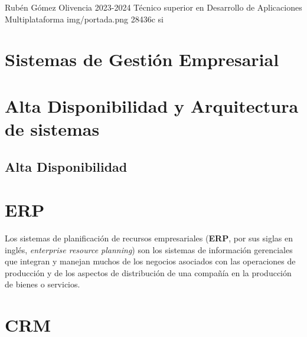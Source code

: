\documentclass{\ClassPath/yukibook}
\begin{document}
    {Rubén Gómez Olivencia}  %
    {2023-2024}    %
    {Técnico superior en \linebreak Desarrollo de  Aplicaciones Multiplataforma} %
    {}%
    {}%
    {img/portada.png} %
    {28436c}
    {si} %

    \coverpage
    \graphicspath{{../../../yukibook.cls/}}
    \licensepage

    \tableofcontents


    \part{Sistemas de Gestión Empresarial}
    \graphicspath{{./img/sge}}
    

    \part{Alta Disponibilidad y Arquitectura de sistemas}
    \chapter{Alta Disponibilidad}
    
    \graphicspath{{../../../temas_comunes/arquitectura_sistemas/img/}}
    



    \part{ERP}
Los sistemas de planificación de recursos empresariales (\textbf{ERP}, por sus siglas en inglés, \textit{enterprise resource planning}) son los sistemas de información gerenciales que integran y manejan muchos de los negocios asociados con las operaciones de producción y de los aspectos de distribución de una compañía en la producción de bienes o servicios.


\part{CRM}
\end{document}
